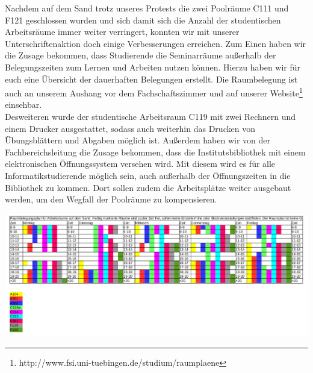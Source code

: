 Nachdem auf dem Sand trotz unseres Protests die zwei Poolräume C111 und F121 geschlossen wurden und sich damit sich die Anzahl der studentischen Arbeitsräume immer weiter verringert, konnten wir mit unserer Unterschriftenaktion doch einige Verbesserungen erreichen. Zum Einen haben wir die Zusage bekommen, dass Studierende die Seminarräume außerhalb der Belegungszeiten zum Lernen und Arbeiten nutzen können. Hierzu haben wir für euch eine Übersicht der dauerhaften Belegungen erstellt. Die Raumbelegung ist auch an unserem Aushang vor dem Fachschaftszimmer und auf unserer Website\footnote{http://www.fsi.uni-tuebingen.de/studium/raumplaene} einsehbar.\\
Desweiteren wurde der studentische Arbeitsraum C119 mit zwei Rechnern und einem Drucker ausgestattet, sodass auch weiterhin das Drucken von Übungsblättern und Abgaben möglich ist.
Außerdem haben wir von der Fachbereichsleitung die Zusage bekommen, dass die Institutsbibliothek mit einem elektronischen Öffnungssystem versehen wird. Mit diesem wird es für alle Informatikstudierende möglich sein, auch außerhalb der Öffnungszeiten in die Bibliothek zu kommen. Dort sollen zudem die Arbeitsplätze weiter ausgebaut werden, um den Wegfall der Poolräume zu kompensieren.

\includegraphics[width=\textwidth]{content/pictures/Raumplan.pdf}
\newpage